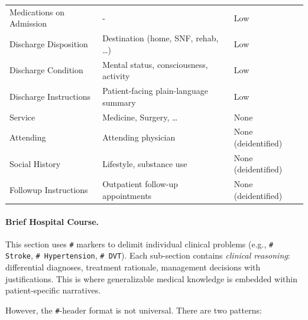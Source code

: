 \documentclass[11pt,a4paper]{article}
\begin{document}
\begin{center}
\begin{tabular}{p{4cm} p{6.5cm}p{3.8cm}}
		Medications on Admission                  & -                                                  & Low                                                 \\
		Discharge Disposition                     & Destination (home, SNF, rehab, \ldots)             & Low                                                 \\
		Discharge Condition                       & Mental status, consciousness, activity             & Low                                                 \\
		Discharge Instructions                    & Patient-facing plain-language summary              & Low                                                 \\
		Service                                   & Medicine, Surgery, \ldots                          & None                                                \\
		Attending                                 & Attending physician                                & None (deidentified)                                 \\
		Social History                            & Lifestyle, substance use                           & None (deidentified)                                 \\
		Followup Instructions                     & Outpatient follow-up appointments                  & None (deidentified)                                 \\
	\end{tabular}
\end{center}
\bigskip

\paragraph{Brief Hospital Course.}
This section uses \texttt{\#} markers to delimit individual clinical problems (e.g., \texttt{\# Stroke}, \texttt{\# Hypertension}, \texttt{\# DVT}).  Each sub-section contains \emph{clinical reasoning}: differential diagnoses, treatment rationale, management decisions with justifications.  This is where generalizable medical knowledge is embedded within patient-specific narratives.

However, the \texttt{\#}-header format is not universal. There are two patterns:
\end{document}
